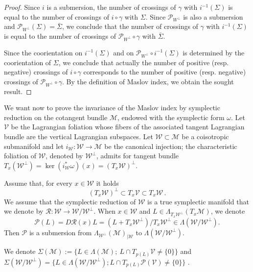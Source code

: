 \documentclass[10pt,a4paper]{amsart}
\numberwithin{equation}{section}
\renewcommand*\P{\mathcal{P}}
\newcommand*\M{\mathcal{M}}
\newcommand*\cw{\mathcal{W}}
\newcommand*\cv{\mathcal{V}}
\newcommand*\cal{\mathcal}
\theoremstyle{definition}
\theoremstyle{remark}
\begin{document}
\begin{proof}
Since $i$ is a submersion, the number of crossings of $\gamma$ with $ i^{-1}({ \Sigma})$ is equal to the number of crossings of $i\circ\gamma$ with ${ \Sigma}$. {Since $\P_{W^\perp}$ is also a submersion and $\P_{W^\perp}(\Sigma)=\bar\Sigma$}, we conclude that the number of crossings of $\gamma$ with $ i^{-1}({ \Sigma})$ is equal to the number of crossings of $\P_{W^\perp}\circ\gamma$ with ${ \overline{\Sigma}}$.

Since the coorientation on $i^{-1}(\Sigma)$ and on $\P_{W^\perp}\circ i^{-1}(\Sigma)$ is determined by the coorientation of $\Sigma$, we conclude that actually the number of positive (resp. negative) crossings of $i\circ\gamma$ corresponds to the number of positive (resp. negative) crossings of $\P_{W^\perp}\circ\gamma$. By the definition of Maslov index, we obtain the sought result.
\end{proof}

We want now to prove the invariance of the Maslov index by symplectic reduction on the cotangent bundle $\M$, endowed with the symplectic form $\omega$. Let $\cv$ be the Lagrangian foliation whose fibers of the associated tangent Lagrangian bundle are the vertical Lagrangian subspaces. Let $\cal W\subset \M$ be a coisotropic submanifold {and let $i_\cw:\cal W\to\M$ be the canonical injection}; the characteristic foliation of $\cal W$,  denoted by $\cal W^\bot$, admits for tangent bundle ${T_x(\cal W^\bot)=}\ker(i^*_\cw\omega)(x)=(T_x\cal W)^\perp$.


Assume that, for every $x\in { \cal W}$ it holds
\[
(T_x\cal W)^\perp\subset T_x\cv\subset T_x\cal W\,.
\]
We assume that the symplectic reduction of $\cal W$ is a true symplectic manifold that we denote by $\cal R: \cal W\to \cal W/\cal W^\bot$. When $x\in\cal W$ and $L\in \Lambda_{T_x\cal W^\bot}(T_x\M)$, we denote
\[
\P(L)=D\cal R(x)L=\left(L+T_x\cal W^\bot\right)/T_x\cal W^\bot\in \Lambda\left(\cal W/\cal W^\bot\right).
\]
Then $\P$ is a submersion from $\Lambda_{\cal W^\bot}(\M)_{|\cal W}$ to $\Lambda(\cw/\cal W^\bot)$.



We denote $\Sigma(\M):= \{ L\in \Lambda(\M) ;\ L\cap T_{p(L)}\cv\neq \{0\} \}$ and $\Sigma(\cal W/\cal W^\bot)=\{ L\in \Lambda(\cal W/\cal W^\bot); L\cap T_{p(L)}\P(\cal V)\neq \{ 0\}\}$ .
\end{document}
